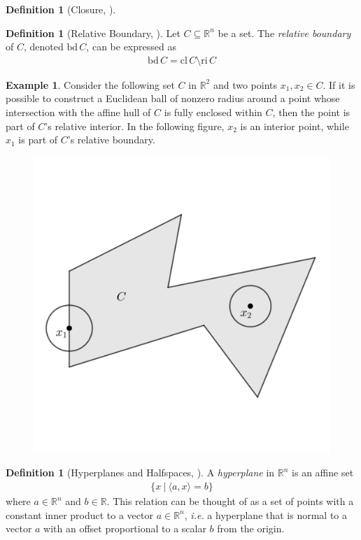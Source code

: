 \documentclass[11pt,reqno]{amsart}
\newcommand{\R}{\mathbb{R}}
\newcommand{\bd}{\mathrm{bd\,}}
\newcommand{\relint}{\mathrm{ri\,}}
\newcommand{\cl}{\mathrm{cl\,}}
\theoremstyle{plain}
\theoremstyle{definition}
\newtheorem{example}[theorem]{Example}
\newtheorem{definition}[theorem]{Definition}
\begin{document}
{\begin{definition}[{Closure, \cite[2.1.3]{boyd_vandenberghe_2004}}]
\end{definition}
\smallskip
\begin{definition}[{Relative Boundary, \cite[2.1.3]{boyd_vandenberghe_2004}}]
    Let $C\subseteq\R^n$ be a set. The \emph{relative boundary} of $C$, denoted $\bd C$, can be expressed as
    \begin{align*}
        \bd C = \cl C \setminus \relint C
    \end{align*}
\end{definition}
\smallskip
\begin{example}
Consider the following set $C$ in $\R^2$ and two points $x_1,x_2\in C$. If it is possible to construct a Euclidean ball of nonzero radius around a point whose intersection with the affine hull of $C$ is fully enclosed within $C$, then the point is part of $C$'s relative interior. In the following figure, $x_2$ is an interior point, while $x_1$ is part of $C$'s relative boundary.
    \begin{figure}[h]
    \centering
    \begin{minipage}{.5\textwidth}
      \centering
      \includegraphics[height = 1.7 in]{relint.png}
      \captionof{figure}{$\relint C$ and $bd C$}
      \label{fig:test1}
    \end{minipage}%
    \end{figure}
\end{example}
\smallskip
\begin{definition}[{Hyperplanes and Halfspaces, \cite[2.2.1]{boyd_vandenberghe_2004}}]
    A \emph{hyperplane} in $\R^n$ is an affine set
    \begin{align*}
        \{x\ |\ \langle a,x\rangle=b\}
    \end{align*}
    where $a\in\R^n$ and $b\in\R$. This relation can be thought of as a set of points with a constant inner product to a vector $a\in\R^n$, \emph{i.e.} a hyperplane that is normal to a vector $a$ with an offset proportional to a scalar $b$ from the origin.


\end{definition}}
\end{document}
